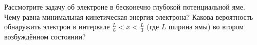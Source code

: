 \documentclass[__main__.tex]{subfiles}
\begin{document}
Рассмотрите задачу об электроне в бесконечно глубокой потенциальной яме. Чему равна минимальная кинетическая энергия электрона? Какова вероятность обнаружить электрон в интервале $\frac{L}{6}<x<\frac{L}{3}$ (где $L$ ширина ямы) во втором возбуждённом состоянии?\\ 

\end{document}
